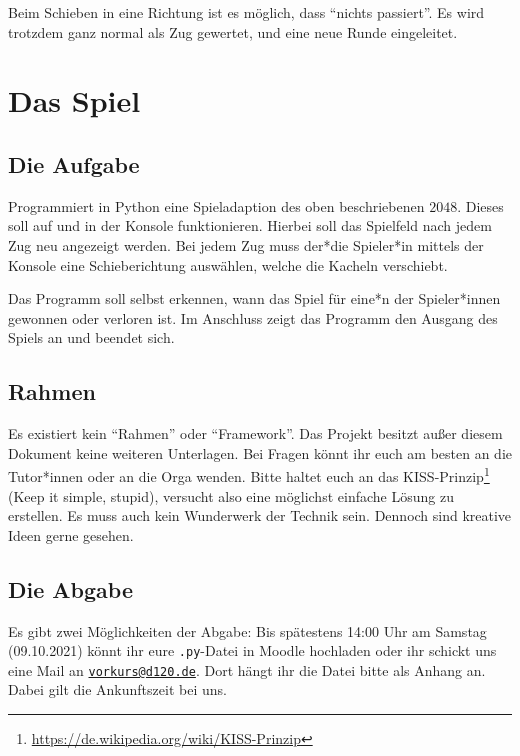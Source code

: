 \documentclass[ngerman,accentcolor=3c,colorbacktitle,12pt,T1]{tudaexercise}
\begin{document}
Beim Schieben in eine Richtung ist es möglich, dass \enquote{nichts passiert}.
Es wird trotzdem ganz normal als Zug gewertet, und eine neue Runde eingeleitet.


\section*{Das Spiel}
\subsection*{Die Aufgabe}
Programmiert in Python eine Spieladaption des oben beschriebenen $2048$.
Dieses soll auf und in der Konsole funktionieren.
Hierbei soll das Spielfeld nach jedem Zug neu angezeigt werden.
Bei jedem Zug muss der*die Spieler*in mittels der Konsole eine Schieberichtung auswählen, welche die Kacheln verschiebt.

Das Programm soll selbst erkennen, wann das Spiel für eine*n der Spieler*innen gewonnen oder verloren ist.
Im Anschluss zeigt das Programm den Ausgang des Spiels an und beendet sich.

\subsection*{Rahmen}
Es existiert kein \enquote{Rahmen} oder \enquote{Framework}.
Das Projekt besitzt außer diesem Dokument keine weiteren Unterlagen.
Bei Fragen könnt ihr euch am besten an die Tutor*innen oder an die Orga wenden.
Bitte haltet euch an das KISS-Prinzip\footnote[2]{\url{https://de.wikipedia.org/wiki/KISS-Prinzip}} (Keep it simple, stupid), versucht also eine möglichst einfache Lösung zu erstellen.
Es muss auch kein Wunderwerk der Technik sein.
Dennoch sind kreative Ideen gerne gesehen.

\subsection*{Die Abgabe}
Es gibt zwei Möglichkeiten der Abgabe: Bis spätestens 14:00 Uhr am Samstag (09.10.2021) könnt ihr eure \texttt{.py}-Datei in Moodle hochladen oder ihr schickt uns eine Mail an \href{mailto:vorkurs@d120.de}{\nolinkurl{vorkurs@d120.de}}.
Dort hängt ihr die Datei bitte als Anhang an.
Dabei gilt die Ankunftszeit bei uns.
\end{document}
